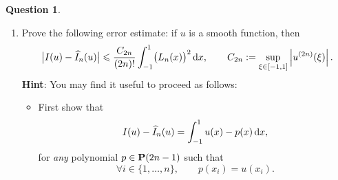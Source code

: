\documentclass[11pt]{article}
\theoremstyle{definition}
\newtheorem{question}{Question}
\theoremstyle{remark}
\begin{document}
\begin{question}
\begin{enumerate}
                \item
                     Prove the following error estimate:
                    if $u$ is a smooth function,
                    then
                    \[
                         \bigl\lvert I(u) - \widehat I_n(u) \bigr\rvert
                         \leqslant \frac{C_{2n}}{(2n)!}\int_{-1}^1 \bigl(L_n(x)\bigr)^2 \, \mathrm d x,
                         \qquad C_{2n} := \sup_{\xi \in [-1, 1]} \left\lvert u^{(2n)}(\xi) \right\rvert.
                    \]
                    \textbf{Hint}: You may find it useful to proceed as follows:
                    \begin{itemize}
                        \item
                            First show that
                            \begin{equation}
                                \label{eq:hermite_interpolation}
                                 I(u) - \widehat I_n(u)
                                = \int_{-1}^{1} u(x) - p(x) \, \mathrm d x,
                            \end{equation}
                            for \emph{any} polynomial $p \in \mathbf P(2n-1)$ such that
                            \begin{equation}
                                \label{eq:polynomial_interp}
                                \forall i \in \{1, \dotsc, n\}, \qquad
                                p(x_i) = u(x_i).
                            \end{equation}


\end{itemize}
\end{enumerate}
\end{question}
\end{document}
